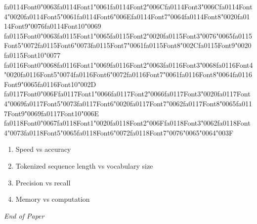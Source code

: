 \documentclass[12pt]{article}
\begin{document}
\begin{enumerate}[label=Q\arabic*.]
{\csname fa0114Font0\endcsname\char"0063}{\csname fa0114Font1\endcsname\char"0061}{\csname fa0114Font2\endcsname\char"006C}{\csname fa0114Font3\endcsname\char"006C}{\csname fa0114Font4\endcsname\char"0020}{\csname fa0114Font5\endcsname\char"0061}{\csname fa0114Font6\endcsname\char"006E}{\csname fa0114Font7\endcsname\char"0064}{\csname fa0114Font8\endcsname\char"0020}{\csname fa0114Font9\endcsname\char"0076}{\csname fa0114Font10\endcsname\char"0069} {\csname fa0115Font0\endcsname\char"0063}{\csname fa0115Font1\endcsname\char"0065}{\csname fa0115Font2\endcsname\char"0020}{\csname fa0115Font3\endcsname\char"0076}{\char"0065}{\csname fa0115Font5\endcsname\char"0072}{\csname fa0115Font6\endcsname\char"0073}{\csname fa0115Font7\endcsname\char"0061}{\csname fa0115Font8\endcsname\char"002C}{\csname fa0115Font9\endcsname\char"0020}{\csname fa0115Font10\endcsname\char"0077} {\csname fa0116Font0\endcsname\char"0068}{\csname fa0116Font1\endcsname\char"0069}{\csname fa0116Font2\endcsname\char"0063}{\csname fa0116Font3\endcsname\char"0068}{\csname fa0116Font4\endcsname\char"0020}{\csname fa0116Font5\endcsname\char"0074}{\csname fa0116Font6\endcsname\char"0072}{\csname fa0116Font7\endcsname\char"0061}{\csname fa0116Font8\endcsname\char"0064}{\csname fa0116Font9\endcsname\char"0065}{\csname fa0116Font10\endcsname\char"002D} {\csname fa0117Font0\endcsname\char"006F}{\csname fa0117Font1\endcsname\char"0066}{\csname fa0117Font2\endcsname\char"0066}{\csname fa0117Font3\endcsname\char"0020}{\csname fa0117Font4\endcsname\char"0069}{\csname fa0117Font5\endcsname\char"0073}{\csname fa0117Font6\endcsname\char"0020}{\csname fa0117Font7\endcsname\char"0062}{\csname fa0117Font8\endcsname\char"0065}{\csname fa0117Font9\endcsname\char"0069}{\csname fa0117Font10\endcsname\char"006E} {\csname fa0118Font0\endcsname\char"0067}{\csname fa0118Font1\endcsname\char"0020}{\csname fa0118Font2\endcsname\char"006F}{\csname fa0118Font3\endcsname\char"0062}{\csname fa0118Font4\endcsname\char"0073}{\csname fa0118Font5\endcsname\char"0065}{\csname fa0118Font6\endcsname\char"0072}{\csname fa0118Font7\endcsname\char"0076}{\char"0065}{\char"0064}{\char"003F}
\begin{enumerate}[label=(\Alph*)]
    \item Speed vs accuracy
    \item Tokenized sequence length vs vocabulary size
    \item Precision vs recall
    \item Memory vs computation
\end{enumerate}
\end{enumerate}

\vfill
\noindent\textit{End of Paper}
\end{document}
